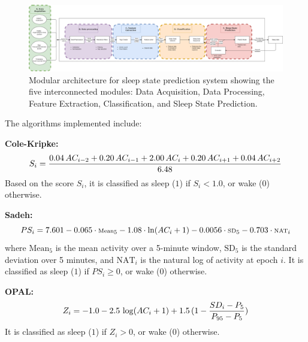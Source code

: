 \documentclass[conference]{IEEEtran}
\begin{document}
\begin{figure}[htbp]
	\centering
	\includegraphics[width=\columnwidth]{system_architecture.png}
	\caption{Modular architecture for sleep state prediction system showing the five interconnected modules: Data Acquisition, Data Processing, Feature Extraction, Classification, and Sleep State Prediction.}
	\label{fig:architecture}
\end{figure}

The algorithms implemented include:

\textbf{Cole-Kripke:}
\begin{equation}
	\scriptsize
	S_i = \frac{0.04\,AC_{i-2} + 0.20\,AC_{i-1} + 2.00\,AC_i + 0.20\,AC_{i+1} + 0.04\,AC_{i+2}}{6.48}
\end{equation}
Based on the score $S_i$, it is classified as sleep ($1$) if $S_i < 1.0$, or wake ($0$) otherwise.


\textbf{Sadeh:}
\begin{equation}
	\scriptsize
	PS_i = 7.601 - 0.065 \cdot \text{Mean}_5 - 1.08 \cdot \ln(AC_i + 1) - 0.0056 \cdot \text{SD}_5 - 0.703 \cdot \text{NAT}_i
\end{equation}
where $\text{Mean}_5$ is the mean activity over a 5-minute window, $\text{SD}_5$ is the standard deviation over 5 minutes, and $\text{NAT}_i$ is the natural log of activity at epoch $i$. It is classified as sleep ($1$) if $PS_i \geq 0$, or wake ($0$) otherwise.

\textbf{OPAL:}
\begin{equation}
	\scriptsize
	Z_i = -1.0 - 2.5\,\log(AC_i + 1) + 1.5\,(1 - \frac{SD_i - P_5}{P_{95} - P_5})
\end{equation}
It is classified as sleep ($1$) if $Z_i > 0$, or wake ($0$) otherwise.
\end{document}
